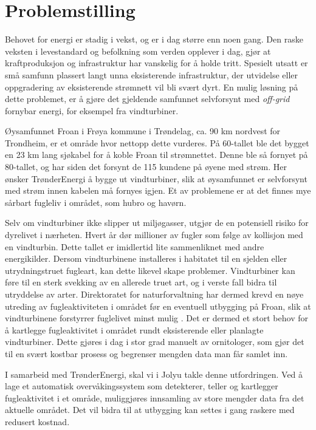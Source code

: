 \section{Problemstilling}
\label{sec:problemstilling}


Behovet for energi er stadig i vekst, og er i dag større enn noen gang. 
Den raske veksten i levestandard og befolkning som verden opplever i dag, gjør at kraftproduksjon og infrastruktur har vanskelig for å holde tritt. 
Spesielt utsatt er små samfunn plassert langt unna eksisterende infrastruktur, der utvidelse eller oppgradering av eksisterende strømnett vil bli svært dyrt. 
En mulig løsning på dette problemet, er å gjøre det gjeldende samfunnet selvforsynt med \textit{off-grid} fornybar energi, for eksempel fra vindturbiner. 

Øysamfunnet Froan i Frøya kommune i Trøndelag, ca. 90 km nordvest for Trondheim, er et område hvor nettopp dette vurderes\cite{AvisFroanVind}. 
På 60-tallet ble det bygget en 23 km lang sjøkabel for å koble Froan til strømnettet. 
Denne ble så fornyet på 80-tallet, og har siden det forsynt de 115 kundene på øyene med strøm. 
Her ønsker TrønderEnergi å bygge ut vindturbiner, slik at øysamfunnet er selvforsynt med strøm innen kabelen må fornyes igjen. 
Et av problemene er at det finnes mye sårbart fugleliv i området, som hubro og havørn\cite{froandn}.

Selv om vindturbiner ikke slipper ut miljøgasser, utgjør de en potensiell risiko for dyrelivet i nærheten. 
Hvert år dør millioner av fugler som følge av kollisjon med en vindturbin\cite{dodfugler}. 
Dette tallet er imidlertid lite sammenliknet med andre energikilder\cite{dodfugler}.
Dersom vindturbinene installeres i habitatet til en sjelden eller utrydningstruet fugleart, kan dette likevel skape problemer.
Vindturbiner kan føre til en sterk svekking av en allerede truet art, og i verste fall bidra til utryddelse av arter. 
Direktoratet for naturforvaltning har dermed krevd en nøye utreding av fugleaktiviteten i området før en eventuell utbygging på Froan, slik at vindturbinene forstyrrer fuglelivet minst mulig \cite{froandn}. 
Det er dermed et stort behov for å kartlegge fugleaktivitet i området rundt eksisterende eller planlagte vindturbiner.
Dette gjøres i dag i stor grad manuelt av ornitologer, som gjør det til en svært kostbar prosess og begrenser mengden data man får samlet inn.

I samarbeid med TrønderEnergi, skal vi i Jolyu takle denne utfordringen. 
Ved å lage et automatisk overvåkingssystem som detekterer, teller og kartlegger fugleaktivitet i et område, muliggjøres innsamling av store mengder data fra det aktuelle området. 
Det vil bidra til at utbygging kan settes i gang raskere med redusert kostnad.